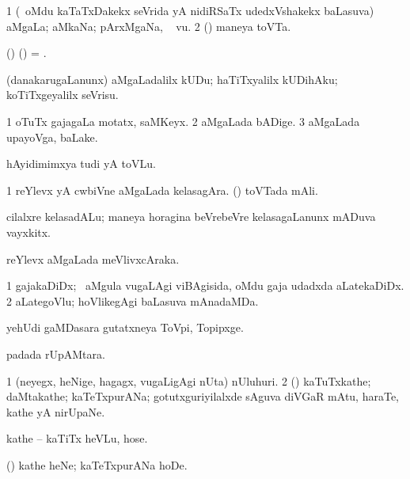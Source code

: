 \bentry
{} 
\gl{\nA}
\bmng
\bnum
\num{1} (\kanmu\ oMdu kaTaTxDakekx seVrida yA nidiRSaTx udedxVshakekx baLasuva) aMgaLa; aMkaNa; pArxMgaNa, \udA\  \mo vu. 
\num{2} (\ame) maneya toVTa.
\enum
\emng

\noindent
\gl{\pagu} 
\bmng
{} (\birx) (\AmA) = .
\emng 
\eentry

\bentry
{} 
\gl{\sakirx} 
\bmng
(danakarugaLanunx) aMgaLadalilx kUDu;  haTiTxyalilx kUDihAku; koTiTxgeyalilx seVrisu.
\emng
\eentry

\bentry
{} 
\gl{\nA} 
\bmng
\bnum
\num{1} oTuTx gajagaLa motatx, saMKeyx.
\num{2} aMgaLada bADige. 
\num{3} aMgaLada upayoVga, baLake.
\enum
\emng 
\eentry

\bentry
{} 
\gl{\nA} 
\bmng
hAyidimimxya tudi yA toVLu.
\emng 
\eentry

\bentry
{} 
\gl{\nA} 
\bmng
\bnum
\num{1} reYlevx yA cwbiVne  aMgaLada kelasagAra. 
 (\ame) 
\banum
{} toVTada mAli. 

 cilalxre kelasadALu; maneya horagina beVrebeVre kelasagaLanunx mADuva vayxkitx.
\eanum
\numie
\enum
\emng
\eentry

\bentry
{} 
\gl{\nA} 
\bmng
reYlevx aMgaLada meVlivxcAraka.
\emng 
\eentry

\bentry
{} 
\gl{\nA}
\bmng
\bnum
\num{1} gajakaDiDx; \sA\ aMgula \mo vugaLAgi viBAgisida, oMdu gaja udadxda aLatekaDiDx. 
\num{2} aLategoVlu; hoVlikegAgi baLasuva mAnadaMDa.
\enum
\emng
\eentry

\bentry
{} 
\gl{\nA} 
\bmng
yehUdi gaMDasara gutatxneya ToVpi, Topipxge.
\emng
\eentry

\bentry
{} 
\gl{\nA} 
\bmng
{} padada rUpAMtara.
\emng
\eentry

\bentry
{} 
\gl{\nA} 
\bmng
\bnum
\num{1} (neyegx, heNige, hagagx, \mo vugaLigAgi nUta) nUluhuri. 
\num{2} (\AmA) kaTuTxkathe; daMtakathe; kaTeTxpurANa; gotutxguriyilalxde sAguva diVGaR mAtu, haraTe, kathe yA nirUpaNe.
\enum
\emng

\noindent
\gl{\pagu} 
\bmng
{} kathe -- kaTiTx heVLu, hose.
\emng
\eentry


\bentry
{} 
\gl{\akirx}
\bmng
(\AmA) kathe heNe; kaTeTxpurANa hoDe.
\emng
\eentry

